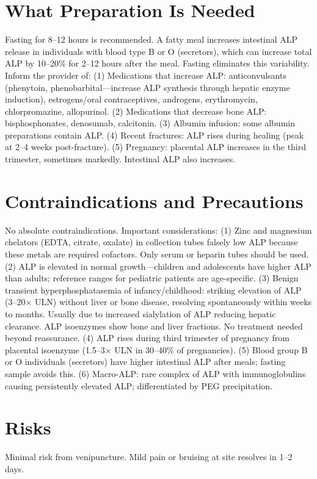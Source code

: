 \section*{What Preparation Is Needed}
Fasting for 8--12 hours is recommended. A fatty meal increases intestinal ALP release in individuals with blood type B or O (secretors), which can increase total ALP by 10--20\% for 2--12 hours after the meal. Fasting eliminates this variability. Inform the provider of: (1) Medications that increase ALP: anticonvulsants (phenytoin, phenobarbital---increase ALP synthesis through hepatic enzyme induction), estrogens/oral contraceptives, androgens, erythromycin, chlorpromazine, allopurinol. (2) Medications that decrease bone ALP: bisphosphonates, denosumab, calcitonin. (3) Albumin infusion: some albumin preparations contain ALP. (4) Recent fractures: ALP rises during healing (peak at 2--4 weeks post-fracture). (5) Pregnancy: placental ALP increases in the third trimester, sometimes markedly. Intestinal ALP also increases.

\section*{Contraindications and Precautions}
No absolute contraindications. Important considerations: (1) Zinc and magnesium chelators (EDTA, citrate, oxalate) in collection tubes falsely low ALP because these metals are required cofactors. Only serum or heparin tubes should be used. (2) ALP is elevated in normal growth---children and adolescents have higher ALP than adults; reference ranges for pediatric patients are age-specific. (3) Benign transient hyperphosphatasemia of infancy/childhood: striking elevation of ALP (3--20$\times$ ULN) without liver or bone disease, resolving spontaneously within weeks to months. Usually due to increased sialylation of ALP reducing hepatic clearance. ALP isoenzymes show bone and liver fractions. No treatment needed beyond reassurance. (4) ALP rises during third trimester of pregnancy from placental isoenzyme (1.5--3$\times$ ULN in 30--40\% of pregnancies). (5) Blood group B or O individuals (secretors) have higher intestinal ALP after meals; fasting sample avoids this. (6) Macro-ALP: rare complex of ALP with immunoglobulins causing persistently elevated ALP; differentiated by PEG precipitation.

\section*{Risks}
Minimal risk from venipuncture. Mild pain or bruising at site resolves in 1--2 days.

